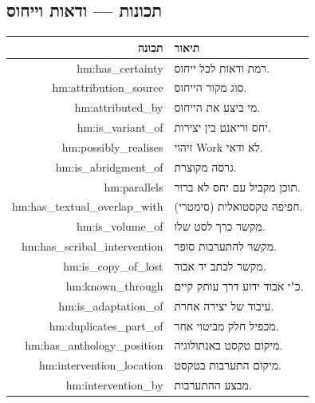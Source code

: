 \documentclass[12pt,a4paper]{article}
\newcommand{\new}[1]{\textcolor{newaddition}{#1}}
\newcommand{\newprop}[1]{\textcolor{newaddition}{#1}}
\begin{document}
\subsection{\new{תכונות   — ודאות וייחוס}}

\begin{longtable}{|r|p{8cm}|}
\hline
\textbf{תכונה} & \textbf{תיאור} \\
\hline
\endhead

\newprop{hm:has\_certainty} & \new{רמת ודאות לכל ייחוס.}\\
\hline
\newprop{hm:attribution\_source} & \new{סוג מקור הייחוס.}\\
\hline
\newprop{hm:attributed\_by} & \new{מי ביצע את הייחוס.}\\
\hline
\newprop{hm:is\_variant\_of} & \new{יחס וריאנט בין יצירות.}\\
\hline
\newprop{hm:possibly\_realises} & \new{זיהוי Work לא ודאי.}\\
\hline
\newprop{hm:is\_abridgment\_of} & \new{גרסה מקוצרת.}\\
\hline
\newprop{hm:parallels} & \new{תוכן מקביל עם יחס לא ברור.}\\
\hline
\newprop{hm:has\_textual\_overlap\_with} & \new{חפיפה טקסטואלית (סימטרי).}\\
\hline
\newprop{hm:is\_volume\_of} & \new{מקשר כרך לסט שלו.}\\
\hline
\newprop{hm:has\_scribal\_intervention} & \new{מקשר להתערבות סופר.}\\
\hline
\newprop{hm:is\_copy\_of\_lost} & \new{מקשר לכתב יד אבוד.}\\
\hline

\newprop{hm:known\_through} & \new{כ"י אבוד ידוע דרך עותק קיים.}\\
\hline

\newprop{hm:is\_adaptation\_of} & \new{עיבוד של יצירה אחרת.}\\
\hline

\newprop{hm:duplicates\_part\_of} & \new{מכפיל חלק מביטוי אחר.}\\
\hline

\newprop{hm:has\_anthology\_position} & \new{מיקום טקסט באנתולוגיה.}\\
\hline

\newprop{hm:intervention\_location} & \new{מיקום התערבות בטקסט.}\\
\hline

\newprop{hm:intervention\_by} & \new{מבצע ההתערבות.}\\
\hline
\end{longtable}
\end{document}
